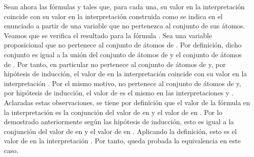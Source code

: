 \begin{isabellebody}
\begin{isamarkuptext}
\begin{demostracion}
  Sean ahora las fórmulas  y  tales que, para cada una, su valor
  en la interpretación \isa{{\isasymA}} coincide con su valor en la
  interpretación \isa{{\isasymA}{\isacharprime}} construida como se indica en el enunciado a 
  partir de una variable que no pertenezca al conjunto de sus átomos. 
  Veamos que se verifica el resultado para la fórmula .
  Sea  una variable proposicional que no pertenece al conjunto de
  átomos de . Por definición, dicho conjunto es igual a la unión
  del conjunto de átomos de  y el conjunto de átomos de .
  Por tanto, en particular  no pertenece al conjunto de átomos de
   y, por hipótesis de inducción, el valor de  en la
  interpretación \isa{{\isasymA}} coincide con su valor en la
  interpretación \isa{{\isasymA}{\isacharprime}}. Por el mismo motivo,  no pertenece al
  conjunto de átomos de  y, por hipótesis de inducción,
  el valor de  es el mismo en las interpretaciones \isa{{\isasymA}} y \isa{{\isasymA}{\isacharprime}}. 
  Aclaradas estas observaciones, se tiene por definición que el valor 
  de la fórmula  en la interpretación \isa{{\isasymA}{\isacharprime}} es 
  la conjunción del valor de  en \isa{{\isasymA}{\isacharprime}} y el valor de  en \isa{{\isasymA}{\isacharprime}}. 
  Por lo demostrado anteriormente según las hipótesis de inducción, 
  esto es igual a la conjunción del valor de  en \isa{{\isasymA}} y el valor de 
   en \isa{{\isasymA}}. Aplicando la definición, esto es el valor de  
  en la interpretación \isa{{\isasymA}}. Por tanto, queda probada la equivalencia 
  en este caso.


\end{demostracion}
\end{isamarkuptext}
\end{isabellebody}
